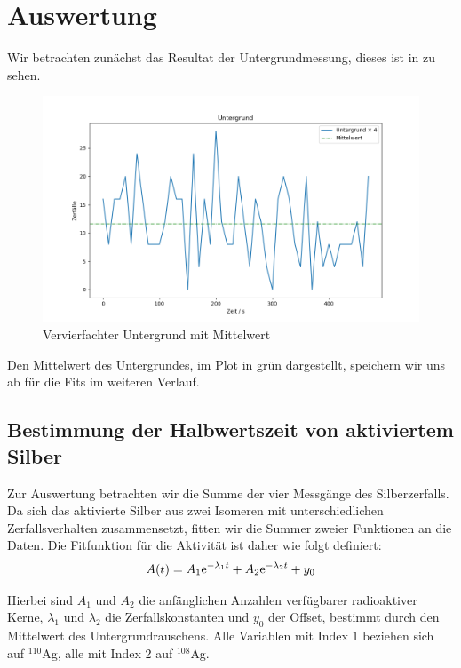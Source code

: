 \section{Auswertung}

Wir betrachten zunächst das Resultat der Untergrundmessung, dieses ist in  zu sehen.

\begin{figure}[H]
    \centering
    \includegraphics[width=.9\textwidth]{files/untergrund.png}
    \caption{Vervierfachter Untergrund mit Mittelwert}
    \label{plot:untergrund}
\end{figure}

Den Mittelwert des Untergrundes, im Plot in grün dargestellt, speichern wir uns ab für die Fits im weiteren Verlauf.

\subsection{Bestimmung der Halbwertszeit von aktiviertem Silber}

Zur Auswertung betrachten wir die Summe der vier Messgänge des Silberzerfalls. Da sich das aktivierte Silber aus zwei Isomeren mit unterschiedlichen Zerfallsverhalten zusammensetzt, fitten wir die Summer zweier Funktionen an die Daten. Die Fitfunktion für die Aktivität ist daher wie folgt definiert:
\begin{align}
A(t) = A_1 \text{e}^{-\lambda_1 t} + A_2 \text{e}^{-\lambda_2 t} + y_0 \label{eq:doulbe_exp_fit_func}
\end{align}

Hierbei sind $A_1$ und $A_2$ die anfänglichen Anzahlen verfügbarer radioaktiver Kerne, $\lambda_1$ und $\lambda_2$ die Zerfallskonstanten und $y_0$ der Offset, bestimmt durch den Mittelwert des Untergrundrauschens. Alle Variablen mit Index $1$ beziehen sich auf $^{110}$Ag, alle mit Index 2 auf $^{108}$Ag.



